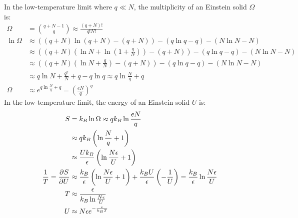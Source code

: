 \documentclass{article}
\begin{document}
In the low-temperature limit where $q \ll N$, the multiplicity of an Einstein solid $\Omega$ is:
\begin{equation}
    \begin{split}
        \Omega & = {q + N - 1 \choose q} \approx \frac{\left(q + N\right)!}{q!N!} \\
        \ln\Omega & \approx \left(\left(q + N\right)\ln\left(q + N\right) - \left(q + N\right)\right) - \left(q\ln q - q\right) - \left(N\ln N - N\right) \\
        & \approx \left(\left(q + N\right)\left(\ln N + \ln\left(1 + \frac{q}{N}\right)\right) - \left(q + N\right)\right) - \left(q\ln q - q\right) - \left(N\ln N - N\right) \\
        & \approx \left(\left(q + N\right)\left(\ln N + \frac{q}{N}\right) - \left(q + N\right)\right) - \left(q\ln q - q\right) - \left(N\ln N - N\right) \\
        & \approx q\ln N + \frac{q^2}{N} + q - q\ln q \approx q\ln\frac{N}{q} + q \\
        \Omega & \approx e^{q\ln\frac{N}{q} + q} = {\left(\frac{eN}{q}\right)}^q
    \end{split}
\end{equation}
In the low-temperature limit, the energy of an Einstein solid $U$ is:
\begin{equation}
    \begin{split}
        S & = k_B\ln\Omega \approx qk_B\ln\frac{eN}{q} \\
        & \approx qk_B\left(\ln \frac{N}{q} + 1\right) \\
        & \approx \frac{Uk_B}{\epsilon}\left(\ln \frac{N\epsilon}{U} + 1\right) \\
        \frac{1}{T} = \frac{\partial^{}S} {\partial U^{}} & \approx \frac{k_B}{\epsilon}\left(\ln \frac{N\epsilon}{U} + 1\right) + \frac{k_B U}{\epsilon}\left(-\frac{1}{U}\right) = \frac{k_B}{\epsilon}\ln\frac{N\epsilon}{U} \\
        T & \approx \frac{\epsilon}{k_B\ln\frac{N\epsilon}{U}} \\
        U & \approx N\epsilon e^{-\frac{\epsilon}{k_B T}} \\
    \end{split}
\end{equation}

\clearpage
\end{document}
